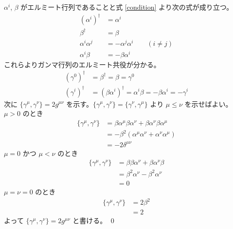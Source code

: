 \documentclass[uplatex,dvipdfmx,a4paper,11pt]{jlreq}
\makeatletter
\theoremstyle{definition}
\renewenvironment{proof}[1][\proofname]{\par
  \normalfont
  \topsep6\p@\@plus6\p@ \trivlist
  \item[\hskip\labelsep{\bfseries #1}\@addpunct{\bfseries}]\ignorespaces\quad\par
}{%
  \qed\endtrivlist\@endpefalse
}
\renewcommand\proofname{証明}
\makeatother
\begin{document}
\begin{proof}
  $\alpha^i$, $\beta$ がエルミート行列であることと式 \eqref{condition} より次の式が成り立つ。
  \begin{align}
    (\alpha^i)^\dagger & = \alpha^i                            \\
    \beta^\dagger      & = \beta                               \\
    \alpha^i\alpha^j   & = - \alpha^j\alpha^i \qquad (i\neq j) \\
    \alpha^i\beta      & = -\beta\alpha^i
  \end{align}
  これらよりガンマ行列のエルミート共役が分かる。
  \begin{align}
    (\gamma^0)^\dagger & = \beta^\dagger = \beta = \gamma^0                                     \\
    (\gamma^i)^\dagger & = (\beta\alpha^i)^\dagger = \alpha^i\beta = -\beta\alpha^i = -\gamma^i
  \end{align}
  次に $\lbrace\gamma^\mu, \gamma^\nu\rbrace = 2g^{\mu\nu}$ を示す。$\lbrace\gamma^\mu, \gamma^\nu\rbrace = \lbrace\gamma^\nu, \gamma^\mu\rbrace$ より $\mu \leq \nu$ を示せばよい。 \\
  $\mu > 0$ のとき
  \begin{align}
    \lbrace\gamma^\mu, \gamma^\nu\rbrace & = \beta\alpha^\mu\beta\alpha^\nu + \beta\alpha^\nu\beta\alpha^\mu \\
                                         & = -\beta^2(\alpha^\mu\alpha^\nu + \alpha^\nu\alpha^\mu)           \\
                                         & = -2\delta^{\mu\nu}
  \end{align}
  $\mu = 0$ かつ $\mu < \nu$ のとき
  \begin{align}
    \lbrace\gamma^\mu, \gamma^\nu\rbrace & = \beta\beta\alpha^\nu + \beta\alpha^\nu\beta \\
                                         & = \beta^2\alpha^\nu - \beta^2\alpha^\nu       \\
                                         & = 0
  \end{align}
  $\mu = \nu = 0$ のとき
  \begin{align}
    \lbrace\gamma^\mu, \gamma^\nu\rbrace & = 2\beta^2 \\
                                         & = 2
  \end{align}
  よって $\lbrace\gamma^\mu, \gamma^\nu\rbrace = 2g^{\mu\nu}$ と書ける。
\end{proof}
\end{document}
